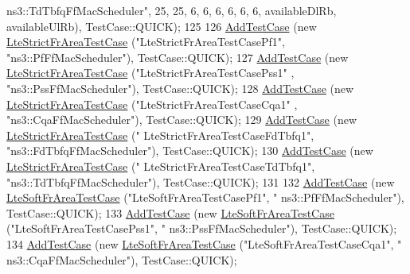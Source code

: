 \begin{DoxyCode}
{      ns3::TdTbfqFfMacScheduler"}, 25, 25, 6, 6, 6, 6, 6, 6, availableDlRb, availableUlRb), TestCase::QUICK);
125 
126   \hyperlink{classns3_1_1TestCase_a3718088e3eefd5d6454569d2e0ddd835}{AddTestCase} (\textcolor{keyword}{new} \hyperlink{classLteStrictFrAreaTestCase}{LteStrictFrAreaTestCase} (\textcolor{stringliteral}{"LteStrictFrAreaTestCasePf1"},
       \textcolor{stringliteral}{"ns3::PfFfMacScheduler"}), TestCase::QUICK);
127   \hyperlink{classns3_1_1TestCase_a3718088e3eefd5d6454569d2e0ddd835}{AddTestCase} (\textcolor{keyword}{new} \hyperlink{classLteStrictFrAreaTestCase}{LteStrictFrAreaTestCase} (\textcolor{stringliteral}{"LteStrictFrAreaTestCasePss1"}
      , \textcolor{stringliteral}{"ns3::PssFfMacScheduler"}), TestCase::QUICK);
128   \hyperlink{classns3_1_1TestCase_a3718088e3eefd5d6454569d2e0ddd835}{AddTestCase} (\textcolor{keyword}{new} \hyperlink{classLteStrictFrAreaTestCase}{LteStrictFrAreaTestCase} (\textcolor{stringliteral}{"LteStrictFrAreaTestCaseCqa1"}
      , \textcolor{stringliteral}{"ns3::CqaFfMacScheduler"}), TestCase::QUICK);
129   \hyperlink{classns3_1_1TestCase_a3718088e3eefd5d6454569d2e0ddd835}{AddTestCase} (\textcolor{keyword}{new} \hyperlink{classLteStrictFrAreaTestCase}{LteStrictFrAreaTestCase} (\textcolor{stringliteral}{"
      LteStrictFrAreaTestCaseFdTbfq1"}, \textcolor{stringliteral}{"ns3::FdTbfqFfMacScheduler"}), TestCase::QUICK);
130   \hyperlink{classns3_1_1TestCase_a3718088e3eefd5d6454569d2e0ddd835}{AddTestCase} (\textcolor{keyword}{new} \hyperlink{classLteStrictFrAreaTestCase}{LteStrictFrAreaTestCase} (\textcolor{stringliteral}{"
      LteStrictFrAreaTestCaseTdTbfq1"}, \textcolor{stringliteral}{"ns3::TdTbfqFfMacScheduler"}), TestCase::QUICK);
131 
132   \hyperlink{classns3_1_1TestCase_a3718088e3eefd5d6454569d2e0ddd835}{AddTestCase} (\textcolor{keyword}{new} \hyperlink{classLteSoftFrAreaTestCase}{LteSoftFrAreaTestCase} (\textcolor{stringliteral}{"LteSoftFrAreaTestCasePf1"}, \textcolor{stringliteral}{"
      ns3::PfFfMacScheduler"}), TestCase::QUICK);
133   \hyperlink{classns3_1_1TestCase_a3718088e3eefd5d6454569d2e0ddd835}{AddTestCase} (\textcolor{keyword}{new} \hyperlink{classLteSoftFrAreaTestCase}{LteSoftFrAreaTestCase} (\textcolor{stringliteral}{"LteSoftFrAreaTestCasePss1"}, \textcolor{stringliteral}{"
      ns3::PssFfMacScheduler"}), TestCase::QUICK);
134   \hyperlink{classns3_1_1TestCase_a3718088e3eefd5d6454569d2e0ddd835}{AddTestCase} (\textcolor{keyword}{new} \hyperlink{classLteSoftFrAreaTestCase}{LteSoftFrAreaTestCase} (\textcolor{stringliteral}{"LteSoftFrAreaTestCaseCqa1"}, \textcolor{stringliteral}{"
      ns3::CqaFfMacScheduler"}), TestCase::QUICK);

\end{DoxyCode}
